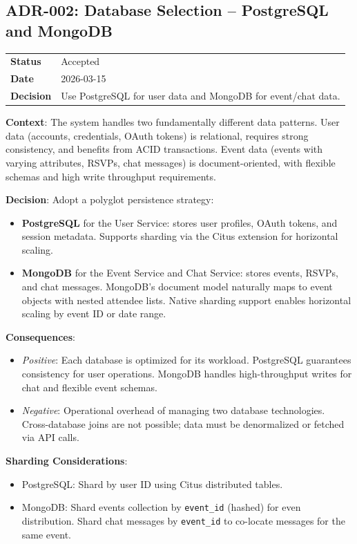 \subsection{ADR-002: Database Selection -- PostgreSQL and MongoDB}

\begin{tabular}{p{3cm}p{10cm}}
\textbf{Status} & Accepted \\
\textbf{Date} & 2026-03-15 \\
\textbf{Decision} & Use PostgreSQL for user data and MongoDB for event/chat data. \\
\end{tabular}

\textbf{Context}: The system handles two fundamentally different data patterns. User data (accounts, credentials, OAuth tokens) is relational, requires strong consistency, and benefits from ACID transactions. Event data (events with varying attributes, RSVPs, chat messages) is document-oriented, with flexible schemas and high write throughput requirements.

\textbf{Decision}: Adopt a polyglot persistence strategy:
\begin{itemize}
    \item \textbf{PostgreSQL} for the User Service: stores user profiles, OAuth tokens, and session metadata. Supports sharding via the Citus extension for horizontal scaling.
    \item \textbf{MongoDB} for the Event Service and Chat Service: stores events, RSVPs, and chat messages. MongoDB's document model naturally maps to event objects with nested attendee lists. Native sharding support enables horizontal scaling by event ID or date range.
\end{itemize}

\textbf{Consequences}:
\begin{itemize}
    \item \textit{Positive}: Each database is optimized for its workload. PostgreSQL guarantees consistency for user operations. MongoDB handles high-throughput writes for chat and flexible event schemas.
    \item \textit{Negative}: Operational overhead of managing two database technologies. Cross-database joins are not possible; data must be denormalized or fetched via API calls.
\end{itemize}

\textbf{Sharding Considerations}:
\begin{itemize}
    \item PostgreSQL: Shard by user ID using Citus distributed tables.
    \item MongoDB: Shard events collection by \texttt{event\_id} (hashed) for even distribution. Shard chat messages by \texttt{event\_id} to co-locate messages for the same event.
\end{itemize}
